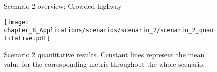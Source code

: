 
\begin{figure}[]
	\centering
	\caption{Scenario 2 overview: Crowded highway}
	\label{fig:chapter_8_Applications/scenarios/scenario_2/scenario_2_route15_town04_testing}
\end{figure}

\begin{figure}[]
	\centering
	\texttt{[image: chapter\_8\_Applications/scenarios/scenario\_2/scenario\_2\_quantitative.pdf]}
	\captionsetup{justification=justified}
	\caption[Scenario 2 quantitative results]{Scenario 2 quantitative results. Constant lines represent the mean value for the corresponding metric throughout the whole scenario.}
	\label{fig:chapter_8_Applications/scenarios/scenario_2/scenario_2_quantitative}
\end{figure}

